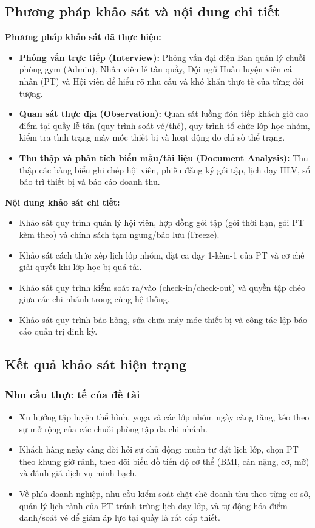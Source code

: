 \documentclass[a4paper,12pt]{article}
\begin{document}
\subsection{Phương pháp khảo sát và nội dung chi tiết}
\textbf{Phương pháp khảo sát đã thực hiện:}
\begin{itemize}
    \item \textbf{Phỏng vấn trực tiếp (Interview):} Phỏng vấn đại diện Ban quản lý chuỗi phòng gym (Admin), Nhân viên lễ tân quầy, Đội ngũ Huấn luyện viên cá nhân (PT) và Hội viên để hiểu rõ nhu cầu và khó khăn thực tế của từng đối tượng.
    \item \textbf{Quan sát thực địa (Observation):} Quan sát luồng đón tiếp khách giờ cao điểm tại quầy lễ tân (quy trình soát vé/thẻ), quy trình tổ chức lớp học nhóm, kiểm tra tình trạng máy móc thiết bị và hoạt động đo chỉ số thể trạng.
    \item \textbf{Thu thập và phân tích biểu mẫu/tài liệu (Document Analysis):} Thu thập các bảng biểu ghi chép hội viên, phiếu đăng ký gói tập, lịch dạy HLV, sổ bảo trì thiết bị và báo cáo doanh thu.
\end{itemize}

\textbf{Nội dung khảo sát chi tiết:}
\begin{itemize}
    \item Khảo sát quy trình quản lý hội viên, hợp đồng gói tập (gói thời hạn, gói PT kèm theo) và chính sách tạm ngưng/bảo lưu (Freeze).
    \item Khảo sát cách thức xếp lịch lớp nhóm, đặt ca dạy 1-kèm-1 của PT và cơ chế giải quyết khi lớp học bị quá tải.
    \item Khảo sát quy trình kiểm soát ra/vào (check-in/check-out) và quyền tập chéo giữa các chi nhánh trong cùng hệ thống.
    \item Khảo sát quy trình báo hỏng, sửa chữa máy móc thiết bị và công tác lập báo cáo quản trị định kỳ.
\end{itemize}

\subsection{Kết quả khảo sát hiện trạng}

\subsubsection{Nhu cầu thực tế của đề tài}
\begin{itemize}
    \item Xu hướng tập luyện thể hình, yoga và các lớp nhóm ngày càng tăng, kéo theo sự mở rộng của các chuỗi phòng tập đa chi nhánh.
    \item Khách hàng ngày càng đòi hỏi sự chủ động: muốn tự đặt lịch lớp, chọn PT theo khung giờ rảnh, theo dõi biểu đồ tiến độ cơ thể (BMI, cân nặng, cơ, mỡ) và đánh giá dịch vụ minh bạch.
    \item Về phía doanh nghiệp, nhu cầu kiểm soát chặt chẽ doanh thu theo từng cơ sở, quản lý lịch rảnh của PT tránh trùng lịch dạy lớp, và tự động hóa điểm danh/soát vé để giảm áp lực tại quầy là rất cấp thiết.
\end{itemize}
\end{document}
